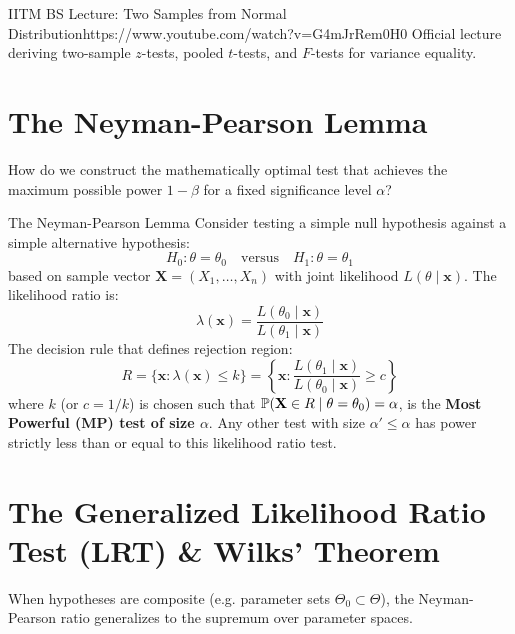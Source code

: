 \begin{videocard}{IITM BS Lecture: Two Samples from Normal Distribution}{https://www.youtube.com/watch?v=G4mJrRem0H0}
Official lecture deriving two-sample $z$-tests, pooled $t$-tests, and $F$-tests for variance equality.
\end{videocard}

\section{The Neyman-Pearson Lemma}

How do we construct the mathematically optimal test that achieves the maximum possible power $1 - \beta$ for a fixed significance level $\alpha$?

\begin{definitionbox}{The Neyman-Pearson Lemma}
Consider testing a simple null hypothesis against a simple alternative hypothesis:
$$H_0 \colon \theta = \theta_0 \quad \text{versus} \quad H_1 \colon \theta = \theta_1$$
based on sample vector $\mathbf{X} = (X_1, \dots, X_n)$ with joint likelihood $L(\theta \mid \mathbf{x})$.
The likelihood ratio is:
$$\lambda(\mathbf{x}) = \frac{L(\theta_0 \mid \mathbf{x})}{L(\theta_1 \mid \mathbf{x})}$$
The decision rule that defines rejection region:
$$R = \{\mathbf{x} \colon \lambda(\mathbf{x}) \le k\} = \left\{\mathbf{x} \colon \frac{L(\theta_1 \mid \mathbf{x})}{L(\theta_0 \mid \mathbf{x})} \ge c\right\}$$
where $k$ (or $c = 1/k$) is chosen such that $\P(\mathbf{X} \in R \mid \theta = \theta_0) = \alpha$, is the \textbf{Most Powerful (MP) test of size $\alpha$}. Any other test with size $\alpha' \le \alpha$ has power strictly less than or equal to this likelihood ratio test.
\end{definitionbox}

\section{The Generalized Likelihood Ratio Test (LRT) \& Wilks' Theorem}

When hypotheses are composite (e.g. parameter sets $\Theta_0 \subset \Theta$), the Neyman-Pearson ratio generalizes to the supremum over parameter spaces.


